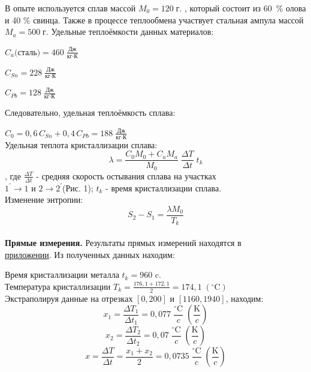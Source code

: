 \documentclass{article}
\begin{document}
 В опыте используется сплав массой $ M_0=120\;\mbox{г.}$ , который состоит из 60~\% олова и 40 \% свинца. Также в процессе теплообмена участвует стальная  ампула массой $ M_a = 500\;\mbox{г.}$ Удельные теплоёмкости данных материалов:
 
 $ C_a\mbox{(сталь)} = 460\; \frac{\mbox{Дж}}{\mbox{кг} \cdot \mbox{К}}$
 
 $ C_{Sn} = 228\; \frac{\mbox{Дж}}{\mbox{кг} \cdot \mbox{К}}$
 
 $ C_{Pb} = 128\; \frac{\mbox{Дж}}{\mbox{кг} \cdot \mbox{К}}$
 
 Следовательно, удельная теплоёмкость сплава:
 
 $ C_0 = 0,6\,C_{Sn}+0,4\,C_{Pb} = 188\; \frac{\mbox{Дж}}{\mbox{кг} \cdot \mbox{К}}$\\
 


 Удельная теплота кристаллизации сплава:\hypertarget{formul1}{}
 \begin{equation}
 	\lambda=\frac{C_0M_0+C_aM_a}{M_0}\;\frac{\Delta T}{\Delta t}\; t_k
 \end{equation}
, где $ \frac{\Delta T}{\Delta t} $ - средняя скорость остывания сплава на участках \\
$ 1^{'}\rightarrow1 $ и $ 2\rightarrow2^{'} $(Рис. 1); $ t_k $ - время кристаллизации сплава.\\

  Изменение энтропии:\hypertarget{formul2}{}
\begin{equation}
	S_2-S_1=\frac{\lambda M_0}{T_k}
\end{equation}\\

\textbf{Прямые измерения.}
Результаты прямых измерений находятся в \\ \hyperlink{table}{приложении}. Из полученных данных находим:

Время кристаллизации металла $ t_k= 960$ c.\\

Температура  кристаллизации $ T_k=\frac{176,1+172,1}{2}=174,1\;(^{\circ}\mbox{C}) $\\

Экстраполируя данные на отрезках $ [0,200] $ и $ [1160,1940] $, находим:
$$ x_1 = \frac{\Delta T_1}{\Delta t_1}=0,077\; \frac{^\circ\mbox{C}}{c}\;\left( \frac{\mbox{K}}{c}\right) $$
$$ x_2 = \frac{\Delta T_2}{\Delta t_2}=0,07\; \frac{^\circ\mbox{C}}{c}\;\left( \frac{\mbox{K}}{c}\right)$$
$$x=\frac{\Delta T}{\Delta t}=\frac{x_1+x_2}{2}=0,0735\; \frac{^\circ\mbox{C}}{c}\;\left( \frac{\mbox{K}}{c}\right)$$
\end{document}

